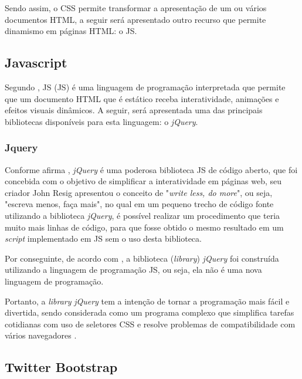 Sendo assim, o \acs{CSS} permite transformar a apresentação de um ou vários
documentos \acs{HTML}, a seguir será apresentado outro recurso que permite
dinamismo em páginas \acs{HTML}: o \acl{JS}.

\subsection{Javascript}

Segundo , \acl{JS} (\acs{JS}) é
uma linguagem de programação interpretada que permite que um documento \acs{HTML} 
que é estático receba interatividade, animações e efeitos visuais dinâmicos. A
seguir, será apresentada uma das principais bibliotecas disponíveis  para esta 
linguagem: o \textit{jQuery}.

\subsubsection{Jquery}

Conforme afirma , 
\textit{jQuery} é uma poderosa biblioteca \acl{JS} de código aberto, que foi
concebida com o objetivo de simplificar a interatividade em páginas web, seu 
criador John Resig apresentou o conceito de "\textit{write less, do more}", ou
seja, "escreva menos, faça mais", no qual em um pequeno trecho de código fonte 
utilizando a biblioteca \textit{jQuery}, é possível realizar um procedimento que
teria muito mais linhas de código, para que fosse obtido o mesmo resultado em um
\textit{script} implementado em \acs{JS} sem o uso desta biblioteca.

Por conseguinte, de acordo com , a biblioteca
(\textit{library}) \textit{jQuery} foi construída utilizando a linguagem de 
programação \acl{JS}, ou seja, ela não é uma nova linguagem de programação.

Portanto, a \textit{library} \textit{jQuery} tem a intenção de tornar a
programação mais fácil e divertida, sendo considerada como um programa complexo
que simplifica tarefas cotidianas com uso de seletores \acs{CSS} e resolve
problemas de compatibilidade com vários navegadores 
\cite{javascriptAndJQueryTheMissingManual}.

\subsection{Twitter Bootstrap}

